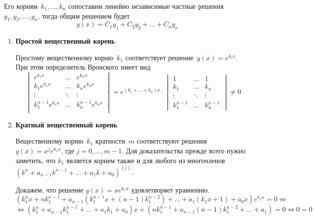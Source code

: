 Его корням~$k_1, \ldots, k_n$ сопоставим линейно независимые частные решения~$y_1, y_2, \ldots, y_n$, тогда общим решением будет
\begin{equation*}
y(x) = C_1 y_1 + C_2 y_2 + \ldots + C_n y_n
\end{equation*}

\begin{enumerate}
	\item \textbf{Простой вещественный корень}
	
	Простому вещественному корню~$k_1$ соответствует решение~$y(x) = e^{k_1 x}$.
	При этом определитель Вронского имеет вид
	\begin{equation*}
	\begin{vmatrix}
	e^{k_1 x} & \ldots & e^{k_n x} \\
	k_1 e^{k_1 x} & \ldots & k_n e^{k_n x} \\
	\vdots & \ddots & \vdots \\
	k_1^{n-1} e^{k_1 x} & \ldots & k_n^{n-1} e^{k_n x} \\
	\end{vmatrix}
	= e^{(k_1 + \ldots + k_n) x} \cdot
	\begin{vmatrix}
	1 & \ldots & 1 \\
	k_1 & \ldots & k_n \\
	\vdots & \ddots & \vdots \\
	k_1^{n-1} & \ldots & k_n^{n-1}
	\end{vmatrix} \neq 0
	\end{equation*}
	
	\item \textbf{Кратный вещественный корень}
	
	Вещественному корню~$k_1$ кратности~$m$ соответствуют решения~$y(x) = x^j e^{k_1 x}$, где $j = 0, \ldots, m - 1$.
	Для доказательства прежде всего нужно заметить, что $k_1$ является корнем также и для любого из многочленов~$(k^n + a_{n-1} k^{n-1} + \ldots + a_1 k + a_0)^{(j)}$.
	
	Докажем, что решение $y(x) = x e^{k_1 x}$ удовлетворяет уравнению.
	\begin{equation*}
	(k_1^n x + n k_1^{n-1} + a_{n-1} (k_1^{n-1} x + (n - 1) k_1^{n-2}) + \ldots + a_1 (k_1 x + 1) + a_0 x) e^{k_1 x} = 0 \Leftrightarrow
	\end{equation*}
	\begin{equation*}
	\Leftrightarrow (k_1^n + a_{n-1} k_1^{n-1} + \ldots + a_1 k_1 + a_0) x + (n k_1^{n-1} + a_{n-1} (n - 1) k_1^{n-2} + \ldots + a_1) = 0 \Leftrightarrow
	0 = 0
	\end{equation*}
	

\end{enumerate}
